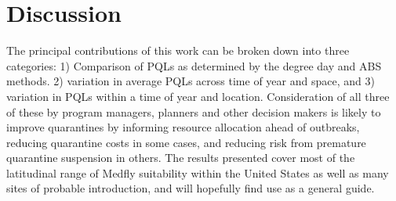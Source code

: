 \documentclass[10pt,a4paper,twocolumn]{article}
\begin{document}




\section*{Discussion}

The principal contributions of this work can be broken down into three categories: 
1) Comparison of PQLs as determined by the degree day and ABS methods. 
2) variation in average PQLs across time of year and space, and
3) variation in PQLs within a time of year and location.
Consideration of all three of these by program managers, planners and other decision makers 
is likely to improve quarantines by informing resource allocation ahead of outbreaks, reducing 
quarantine costs in some cases, and reducing risk from premature quarantine suspension in others. 
The results presented cover most of the latitudinal range 
of Medfly suitability within the United States 
as well as many sites of probable introduction,
and will hopefully find use as a general guide.
\end{document}

